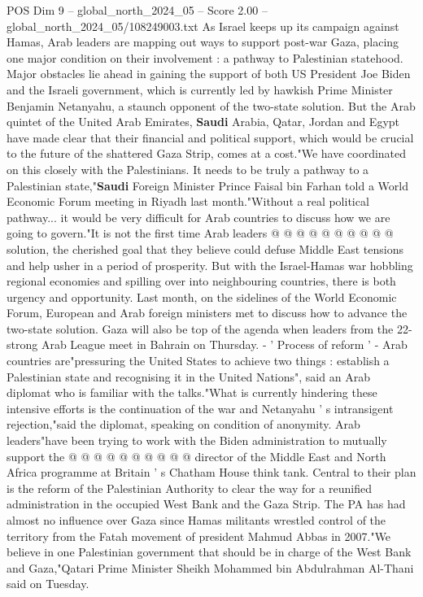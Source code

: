 \begin{textsample}{POS Dim 9 – global\_north\_2024\_05 – Score 2.00 – global\_north\_2024\_05/108249003.txt}  \label{ex:f9_pos_206}
As Israel keeps up its campaign against Hamas, Arab leaders are mapping out ways to support post-war Gaza, placing one major condition on their involvement : a pathway to Palestinian statehood.
Major obstacles lie ahead in gaining the support of both US President Joe Biden and the Israeli government, which is currently led by hawkish Prime Minister Benjamin Netanyahu, a staunch opponent of the two-state solution.
But the Arab quintet of the United Arab Emirates, \textbf{Saudi} Arabia, Qatar, Jordan and Egypt have made clear that their financial and political support, which would be crucial to the future of the shattered Gaza Strip, comes at a cost."We have coordinated on this closely with the Palestinians.
It needs to be truly a pathway to a Palestinian state,"\textbf{Saudi} Foreign Minister Prince Faisal bin Farhan told a World Economic Forum meeting in Riyadh last month."Without a real political pathway... it would be very difficult for Arab countries to discuss how we are going to govern."It is not the first time Arab leaders @ @ @ @ @ @ @ @ @ @ solution, the cherished goal that they believe could defuse Middle East tensions and help usher in a period of prosperity.
But with the Israel-Hamas war hobbling regional economies and spilling over into neighbouring countries, there is both urgency and opportunity.
Last month, on the sidelines of the World Economic Forum, European and Arab foreign ministers met to discuss how to advance the two-state solution.
Gaza will also be top of the agenda when leaders from the 22-strong Arab League meet in Bahrain on Thursday. - ' Process of reform ' - Arab countries are"pressuring the United States to achieve two things : establish a Palestinian state and recognising it in the United Nations", said an Arab diplomat who is familiar with the talks."What is currently hindering these intensive efforts is the continuation of the war and Netanyahu ' s intransigent rejection,"said the diplomat, speaking on condition of anonymity.
Arab leaders"have been trying to work with the Biden administration to mutually support the @ @ @ @ @ @ @ @ @ @ director of the Middle East and North Africa programme at Britain ' s Chatham House think tank.
Central to their plan is the reform of the Palestinian Authority to clear the way for a reunified administration in the occupied West Bank and the Gaza Strip.
The PA has had almost no influence over Gaza since Hamas militants wrestled control of the territory from the Fatah movement of president Mahmud Abbas in 2007."We believe in one Palestinian government that should be in charge of the West Bank and Gaza,"Qatari Prime Minister Sheikh Mohammed bin Abdulrahman Al-Thani said on Tuesday.

\end{textsample}
